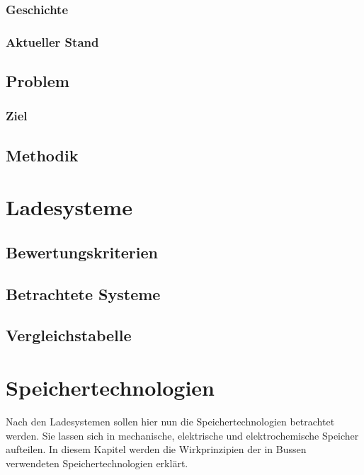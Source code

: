 \documentclass[twoside]{scrreprt}
\begin{document}
\subsection{Geschichte}
\subsection{Aktueller Stand}
\section{Problem} %
\subsection{Ziel} %
\section{Methodik} %

\chapter{Ladesysteme} %
\section{Bewertungskriterien} %
\section{Betrachtete Systeme} %
\section{Vergleichstabelle}

\chapter{Speichertechnologien} %
Nach den Ladesystemen sollen hier nun die Speichertechnologien betrachtet werden. Sie lassen sich in mechanische, elektrische und elektrochemische Speicher aufteilen. In diesem Kapitel werden die Wirkprinzipien der in Bussen verwendeten Speichertechnologien erklärt.\\
\end{document}

